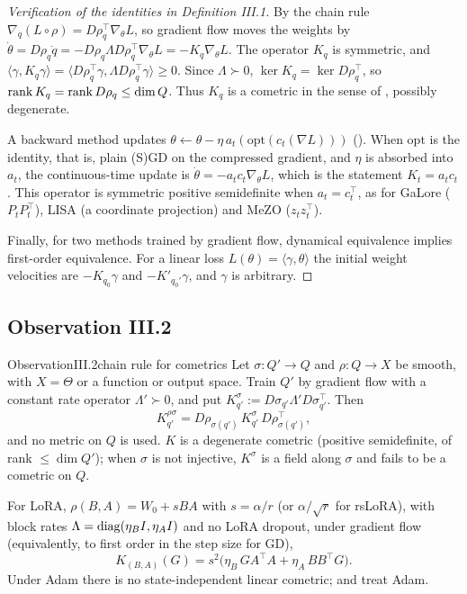 \begin{proof}[Verification of the identities in Definition III.1]
By the chain rule $\nabla_q(L\circ\rho)=D\rho_q^\top\nabla_\theta L$, so gradient flow moves the weights by
$\dot\theta=D\rho_q\dot q=-D\rho_q\Lambda D\rho_q^\top\nabla_\theta L=-K_q\nabla_\theta L$. The operator $K_q$ is
symmetric, and $\langle\gamma,K_q\gamma\rangle=\langle D\rho_q^\top\gamma,\Lambda D\rho_q^\top\gamma\rangle\ge0$. Since
$\Lambda\succ0$, $\ker K_q=\ker D\rho_q^\top$, so $\operatorname{rank} K_q=\operatorname{rank} D\rho_q\le\dim Q$. Thus $K_q$ is a cometric in the sense
of , possibly degenerate.

A backward method updates $\theta\leftarrow\theta-\eta\,a_t(\mathrm{opt}(c_t(\nabla L)))$ ().
When $\mathrm{opt}$ is the identity, that is, plain (S)GD on the compressed gradient, and $\eta$ is absorbed into $a_t$,
the continuous-time update is $\dot\theta=-a_tc_t\nabla_\theta L$, which is the statement $K_t=a_tc_t$. This operator
is symmetric positive semidefinite when $a_t=c_t^\top$, as for GaLore ($P_tP_t^\top$), LISA (a coordinate projection)
and MeZO ($z_tz_t^\top$).

Finally, for two methods trained by gradient flow, dynamical equivalence implies first-order equivalence. For a linear
loss $L(\theta)=\langle\gamma,\theta\rangle$ the initial weight velocities are $-K_{q_0}\gamma$ and $-K'_{q_0'}\gamma$,
and $\gamma$ is arbitrary.
\end{proof}

\subsection{Observation III.2}\label{proof:III.2}

\begin{restate}{Observation}{III.2}{chain rule for cometrics}
Let $\sigma:Q'\to Q$ and $\rho:Q\to X$ be smooth, with $X=\Theta$ or a function or output space. Train $Q'$ by gradient
flow with a constant rate operator $\Lambda'\succ0$, and put $K^\sigma_{q'}:=D\sigma_{q'}\Lambda'D\sigma_{q'}^\top$. Then
\[K^{\rho\sigma}_{q'}=D\rho_{\sigma(q')}\,K^\sigma_{q'}\,D\rho_{\sigma(q')}^\top,\]
and no metric on $Q$ is used. $K$ is a degenerate cometric (positive semidefinite, of rank $\le\dim Q'$); when $\sigma$
is not injective, $K^\sigma$ is a field along $\sigma$ and fails to be a cometric on $Q$.

For LoRA, $\rho(B,A)=W_0+sBA$ with $s=\alpha/r$ (or $\alpha/\sqrt r$ for rsLoRA), with block rates
$\Lambda=\operatorname{diag}(\eta_BI,\eta_AI)$ and no LoRA dropout, under gradient flow (equivalently, to first order in the step
size for GD),
\[K_{(B,A)}(G)=s^2\big(\eta_B\,GA^\top A+\eta_A\,BB^\top G\big).\]
Under Adam there is no state-independent linear cometric;  and  treat
Adam.
\end{restate}

